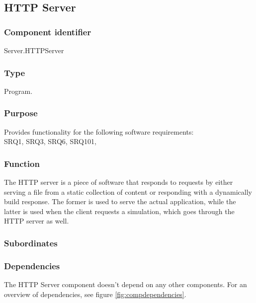 \subsection{HTTP Server}

\subsubsection*{Component identifier}
Server.HTTPServer

\subsubsection*{Type}
Program.

\subsubsection*{Purpose}
Provides functionality for the following software requirements:\\
SRQ1, SRQ3, SRQ6, SRQ101, 

\subsubsection*{Function}
The HTTP server is a piece of software that responds to requests by either serving a file from a static collection of content or responding with a dynamically build response. The former is used to serve the actual application, while the latter is used when the client requests a simulation, which goes through the HTTP server as well.

\subsubsection*{Subordinates}

\subsubsection*{Dependencies}
The HTTP Server component doesn't depend on any other components. For an overview of dependencies, see figure \ref{fig:compdependencies}.

